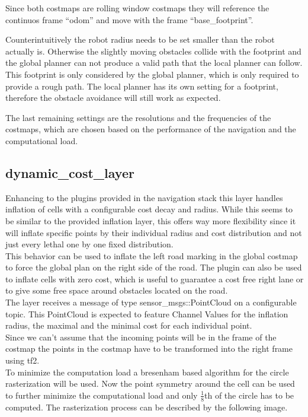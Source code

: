 Since both costmaps are rolling window costmaps they will reference the continuos frame ``odom'' and move with the frame ``base\_footprint''.

Counterintuitively the robot radius needs to be set smaller than the robot actually is. Otherwise the slightly moving obstacles collide with the footprint and the global planner can not produce a valid path that the local planner can follow.\\
This footprint is only considered by the global planner, which is only required to provide a rough path. The local planner has its own setting for a footprint, therefore the obstacle avoidance will still work as expected.

The last remaining settings are the resolutions and the frequencies of the costmaps, which are chosen based on the performance of the navigation and the computational load.


\subsection{dynamic\_cost\_layer}
Enhancing to the plugins provided in the navigation stack this layer handles inflation of cells with a configurable cost decay and radius. While this seems to be similar to the provided inflation layer, this offers way more flexibility since it will inflate specific points by their individual radius and cost distribution and not just every lethal one by one fixed distribution.\\

This behavior can be used to inflate the left road marking in the global costmap to force the global plan on the right side of the road. The plugin can also be used to inflate cells with zero cost, which is useful to guarantee a cost free right lane or to give some free space around obstacles located on the road.\\

The layer receives a message of type sensor\_msgs::PointCloud on a configurable topic. This PointCloud is expected to feature Channel Values for the inflation radius, the maximal and the minimal cost for each individual point.\\

Since we can't assume that the incoming points will be in the frame of the costmap the points in the costmap have to be transformed into the right frame using tf2.\\

To minimize the computation load a bresenham based algorithm for the circle rasterization will be used.\cite{ComputerGraphics} Now the point symmetry around the cell can be used to further minimize the computational load and only $\frac{1}{8}$th of the circle has to be computed. The rasterization process can be described by the following image.\\


